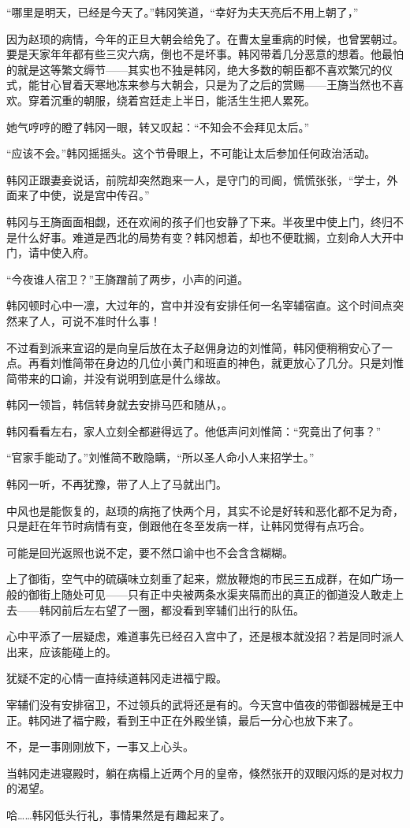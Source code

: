 “哪里是明天，已经是今天了。”韩冈笑道，“幸好为夫天亮后不用上朝了，”

因为赵顼的病情，今年的正旦大朝会给免了。在曹太皇重病的时候，也曾罢朝过。要是天家年年都有些三灾六病，倒也不是坏事。韩冈带着几分恶意的想着。他最怕的就是这等繁文缛节——其实也不独是韩冈，绝大多数的朝臣都不喜欢繁冗的仪式，能甘心冒着天寒地冻来参与大朝会，只是为了之后的赏赐——王旖当然也不喜欢。穿着沉重的朝服，绕着宫廷走上半日，能活生生把人累死。

她气哼哼的瞪了韩冈一眼，转又叹起：“不知会不会拜见太后。”

“应该不会。”韩冈摇摇头。这个节骨眼上，不可能让太后参加任何政治活动。

韩冈正跟妻妾说话，前院却突然跑来一人，是守门的司阍，慌慌张张，“学士，外面来了中使，说是宫中传召。”

韩冈与王旖面面相觑，还在欢闹的孩子们也安静了下来。半夜里中使上门，终归不是什么好事。难道是西北的局势有变？韩冈想着，却也不便耽搁，立刻命人大开中门，请中使入府。

“今夜谁人宿卫？”王旖蹭前了两步，小声的问道。

韩冈顿时心中一凛，大过年的，宫中并没有安排任何一名宰辅宿直。这个时间点突然来了人，可说不准时什么事！

不过看到派来宣诏的是向皇后放在太子赵佣身边的刘惟简，韩冈便稍稍安心了一点。再看刘惟简带在身边的几位小黄门和班直的神色，就更放心了几分。只是刘惟简带来的口谕，并没有说明到底是什么缘故。

韩冈一领旨，韩信转身就去安排马匹和随从，。

韩冈看看左右，家人立刻全都避得远了。他低声问刘惟简：“究竟出了何事？”

“官家手能动了。”刘惟简不敢隐瞒，“所以圣人命小人来招学士。”

韩冈一听，不再犹豫，带了人上了马就出门。

中风也是能恢复的，赵顼的病拖了快两个月，其实不论是好转和恶化都不足为奇，只是赶在年节时病情有变，倒跟他在冬至发病一样，让韩冈觉得有点巧合。

可能是回光返照也说不定，要不然口谕中也不会含含糊糊。

上了御街，空气中的硫磺味立刻重了起来，燃放鞭炮的市民三五成群，在如广场一般的御街上随处可见——只有正中央被两条水渠夹隔而出的真正的御道没人敢走上去——韩冈前后左右望了一圈，都没看到宰辅们出行的队伍。

心中平添了一层疑虑，难道事先已经召入宫中了，还是根本就没招？若是同时派人出来，应该能碰上的。

犹疑不定的心情一直持续道韩冈走进福宁殿。

宰辅们没有安排宿卫，不过领兵的武将还是有的。今天宫中值夜的带御器械是王中正。韩冈进了福宁殿，看到王中正在外殿坐镇，最后一分心也放下来了。

不，是一事刚刚放下，一事又上心头。

当韩冈走进寝殿时，躺在病榻上近两个月的皇帝，倏然张开的双眼闪烁的是对权力的渴望。

哈……韩冈低头行礼，事情果然是有趣起来了。

